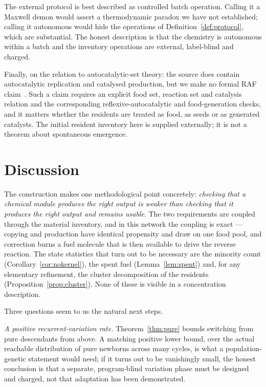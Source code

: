 \documentclass[11pt,a4paper]{article}
\theoremstyle{plain}
\theoremstyle{definition}
\theoremstyle{remark}
\begin{document}
The external protocol is best described as controlled batch operation. Calling it a
Maxwell demon would assert a thermodynamic paradox we have not established; calling it
autonomous would hide the operations of Definition~\ref{def:protocol}, which are
substantial. The honest description is that the chemistry is autonomous within a batch and
the inventory operations are external, label-blind and charged.

Finally, on the relation to autocatalytic-set theory: the source does contain autocatalytic
replication and catalysed production, but we make no formal RAF claim~\citep{hordijk2004,%
blokhuis2020}. Such a claim requires an explicit food set, reaction set and catalysis
relation and the corresponding reflexive-autocatalytic and food-generation checks, and it
matters whether the residents are treated as food, as seeds or as generated catalysts.
The initial resident inventory here is supplied externally; it is not a theorem about
spontaneous emergence.

\section{Discussion}\label{sec:discussion}

The construction makes one methodological point concretely: \emph{checking that a chemical
module produces the right output is weaker than checking that it produces the right output
and remains usable}. The two requirements are coupled through the material inventory, and
in this network the coupling is exact --- copying and production have identical propensity
and draw on one food pool, and correction burns a fuel molecule that is then available to
drive the reverse reaction. The state statistics that turn out to be necessary are the
minority count (Corollary~\ref{cor:nokernel}), the spent fuel (Lemma~\ref{lem:spent}) and,
for any elementary refinement, the cluster decomposition of the residents
(Proposition~\ref{prop:cluster}). None of these is visible in a concentration description.

Three questions seem to us the natural next steps.

\emph{A positive recurrent-variation rate.} Theorem~\ref{thm:pure} bounds switching from
pure descendants from above. A matching positive lower bound, over the actual reachable
distribution of pure newborns across many cycles, is what a population-genetic statement
would need; if it turns out to be vanishingly small, the honest conclusion is that a
separate, program-blind variation phase must be designed and charged, not that adaptation
has been demonstrated.
\end{document}
